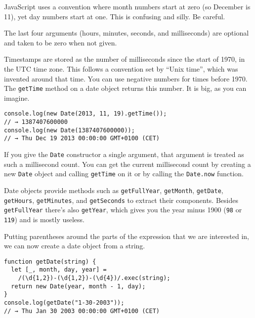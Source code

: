JavaScript uses a convention where month numbers start at zero (so December is 11), yet day numbers start at one. This is confusing and silly. Be careful.

The last four arguments (hours, minutes, seconds, and milliseconds) are optional and taken to be zero when not given.

Timestamps are stored as the number of milliseconds since the start of 1970, in the UTC time zone. This follows a convention set by ``Unix time'', which was invented around that time. You can use negative numbers for times before 1970. The \lstinline`getTime` method on a date object returns this number. It is big, as you can imagine.

\begin{lstlisting}
console.log(new Date(2013, 11, 19).getTime());
// → 1387407600000
console.log(new Date(1387407600000));
// → Thu Dec 19 2013 00:00:00 GMT+0100 (CET)
\end{lstlisting}
\noindent{}

If you give the \lstinline`Date` constructor a single argument, that argument is treated as such a millisecond count. You can get the current millisecond count by creating a new \lstinline`Date` object and calling \lstinline`getTime` on it or by calling the \lstinline`Date.now` function.

Date objects provide methods such as \lstinline`getFullYear`, \lstinline`getMonth`, \lstinline`getDate`, \lstinline`getHours`, \lstinline`getMinutes`, and \lstinline`getSeconds` to extract their components. Besides \lstinline`getFullYear` there's also \lstinline`getYear`, which gives you the year minus 1900 (\lstinline`98` or \lstinline`119`) and is mostly useless.

Putting parentheses around the parts of the expression that we are interested in, we can now create a date object from a string.

\begin{lstlisting}
function getDate(string) {
  let [_, month, day, year] =
    /(\d{1,2})-(\d{1,2})-(\d{4})/.exec(string);
  return new Date(year, month - 1, day);
}
console.log(getDate("1-30-2003"));
// → Thu Jan 30 2003 00:00:00 GMT+0100 (CET)
\end{lstlisting}
\noindent{}

